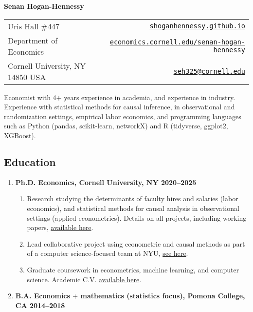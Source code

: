 \documentclass[letterpaper,11pt,oneside]{article}
\begin{document}
\centerline{\LARGE{\textbf{Senan Hogan-Hennessy}}}
\vspace{0.1cm}
\begin{table}[H]
    \centering
    \begin{tabular*}{\textwidth}{l @{\extracolsep{\fill}} r}
        \toprule
        Uris Hall \#447 &
            \href{https://shoganhennessy.github.io}{
                \nolinkurl{shoganhennessy.github.io}} \\
        Department of Economics &
            \href{https://economics.cornell.edu/senan-hogan-hennessy}{
                \nolinkurl{economics.cornell.edu/senan-hogan-hennessy}} \\
        Cornell University, NY 14850 USA &
            \href{mailto:seh325@cornell.edu}{\nolinkurl{seh325@cornell.edu}} \\
        \bottomrule
    \end{tabular*}
\end{table}

Economist with 4$+$ years experience in academia, and experience in industry.
Experience with statistical methods for causal inference, in observational and randomization settings, empirical labor economics, and programming languages such as Python (pandas, scikit-learn, networkX) and R (tidyverse, ggplot2, XGBoost). 

\subsection*{Education}
\begin{enumerate}[itemsep=2.5pt, label={}, leftmargin=0pt]
    \item \textbf{Ph.D. Economics, Cornell University, NY \hfill 2020--2025}%
    \begin{enumerate}[itemsep=0pt, label={\textbf{--}}, leftmargin=12pt]
        \item Research studying the determinants of faculty hires and salaries (labor economics), and statistical methods for causal analysis in observational settings (applied econometrics).
        Details on all projects, including working papers, \href{https://shoganhennessy.github.io/research/}{available here}.

        \item Lead collaborative project using econometric and causal methods as part of a computer science-focused team at NYU, \href{https://doi.org/10.48550/arXiv.2210.07970}{see here}.
        
        \item Graduate coursework in econometrics, machine learning, and computer science.
        Academic C.V. \href{https://shoganhennessy.github.io/files/cv/cv-shoganhennessy.pdf}{available here}.
\end{enumerate}
    
    \item \textbf{B.A. Economics $+$ mathematics (statistics focus), Pomona College, CA \hfill 2014--2018}
\end{enumerate}
\end{document}

